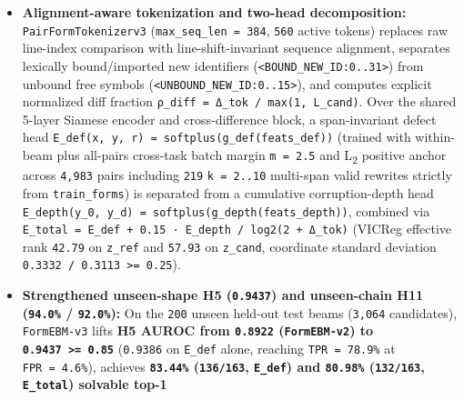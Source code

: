 \documentclass[10pt,letterpaper]{article}
\providecommand{\tightlist}{\setlength{\itemsep}{1pt}\setlength{\parskip}{0pt}}
\begin{document}
\begin{itemize}
\tightlist
\item
  \textbf{Alignment-aware tokenization and two-head decomposition:}
  \texttt{PairFormTokenizerv3} (\texttt{max\_\allowbreak{}seq\_\allowbreak{}len\ =\ 384},
  \texttt{560} active tokens) replaces raw line-index comparison with
  line-shift-invariant sequence alignment, separates lexically
  bound/imported new identifiers
  (\texttt{\textless{}BOUND\_NEW\_ID:0..31\textgreater{}}) from unbound
  free symbols
  (\texttt{\textless{}UNBOUND\_NEW\_ID:0..15\textgreater{}}), and
  computes explicit normalized diff fraction
  \texttt{ρ\_\allowbreak{}diff\ =\ Δ\_\allowbreak{}tok\ /\allowbreak{}\ max(\allowbreak{}1,\allowbreak{}\ L\_\allowbreak{}cand)}. Over the shared
  5-layer Siamese encoder and cross-difference block, a span-invariant
  defect head
  \texttt{E\_\allowbreak{}def(\allowbreak{}x,\allowbreak{}\ y,\allowbreak{}\ r)\ =\ softplus(\allowbreak{}g\_\allowbreak{}def(\allowbreak{}feats\_\allowbreak{}def))} (trained
  with within-beam plus all-pairs cross-task batch margin
  \texttt{m\ =\ 2.5} and L\textsubscript{2} positive anchor across
  \texttt{4,983} pairs including \texttt{219} \texttt{k\ =\ 2.\allowbreak{}.\allowbreak{}10}
  multi-span valid rewrites strictly from \texttt{train\_\allowbreak{}forms}) is
  separated from a cumulative corruption-depth head
  \texttt{E\_\allowbreak{}depth(\allowbreak{}y\_\allowbreak{}0,\allowbreak{}\ y\_\allowbreak{}d)\ =\ softplus(\allowbreak{}g\_\allowbreak{}depth(\allowbreak{}feats\_\allowbreak{}depth))},
  combined via
  \texttt{E\_\allowbreak{}total\ =\ E\_\allowbreak{}def\ +\ 0.\allowbreak{}15\ ·\ E\_\allowbreak{}depth\ /\allowbreak{}\ log2(\allowbreak{}2\ +\ Δ\_\allowbreak{}tok)}
  (VICReg effective rank \texttt{42.79} on \texttt{z\_ref} and
  \texttt{57.93} on \texttt{z\_cand}, coordinate standard deviation
  \texttt{0.3332\ /\ 0.3113\ \textgreater{}=\ 0.25}).
\item
  \textbf{Strengthened unseen-shape H5 (\texttt{0.9437}) and
  unseen-chain H11 (\texttt{94.0\%} / \texttt{92.0\%}):} On the
  \texttt{200} unseen held-out test beams (\texttt{3,064} candidates),
  \texttt{FormEBM-\allowbreak{}v3} lifts \textbf{H5 AUROC from \texttt{0.8922}
  (\texttt{FormEBM-\allowbreak{}v2}) to \texttt{0.9437\ \textgreater{}=\ 0.85}}
  (\texttt{0.9386} on \texttt{E\_def} alone, reaching
  \texttt{TPR\ =\ 78.\allowbreak{}9\%} at \texttt{FPR\ =\ 4.\allowbreak{}6\%}), achieves
  \textbf{\texttt{83.44\%} (\texttt{136/163}, \texttt{E\_def}) and
  \texttt{80.98\%} (\texttt{132/163}, \texttt{E\_total}) solvable top-1
}
\end{itemize}
\end{document}
